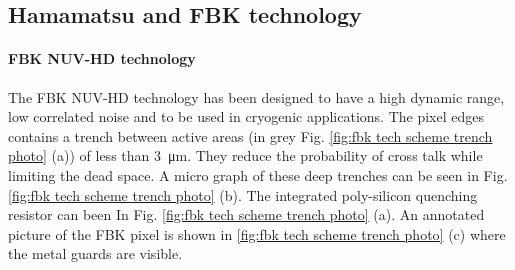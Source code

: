 \subsection{Hamamatsu and FBK technology}
\label{ch:background:SiPM:characterised detectors:FBKvsH}

\paragraph{FBK NUV-HD technology}
The FBK \ac{NUV-HD} technology has been designed to have a high dynamic range, low correlated noise and to be used in cryogenic applications. The pixel edges contains a trench between active areas (in grey Fig. \ref{fig:fbk tech scheme trench photo} (a)) of less than \SI{3}{\micro m}. They reduce the probability of cross talk while limiting the dead space. A micro graph of these deep trenches can be seen in Fig. \ref{fig:fbk tech scheme trench photo} (b). The integrated poly-silicon quenching resistor can been In Fig. \ref{fig:fbk tech scheme trench photo} (a). An annotated picture of the FBK pixel is shown in \ref{fig:fbk tech scheme trench photo} (c) where the metal guards are visible. 
